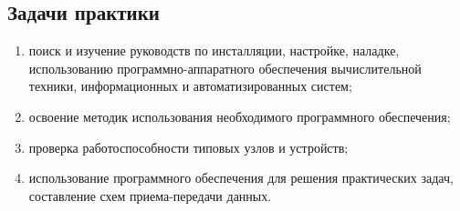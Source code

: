 \documentclass[a4paper, 12pt]{article}
\begin{document}
\subsection*{Задачи практики}
\begin{enumerate}
  \item  поиск и изучение руководств по инсталляции, настройке, наладке, использованию программно-аппаратного обеспечения вычислительной техники, информационных и автоматизированных систем;
  \item  освоение методик использования необходимого программного обеспечения;
  \item  проверка работоспособности типовых узлов и устройств;
  \item  использование программного обеспечения для решения практических задач, составление схем приема-передачи данных.
\end{enumerate}
\end{document}

